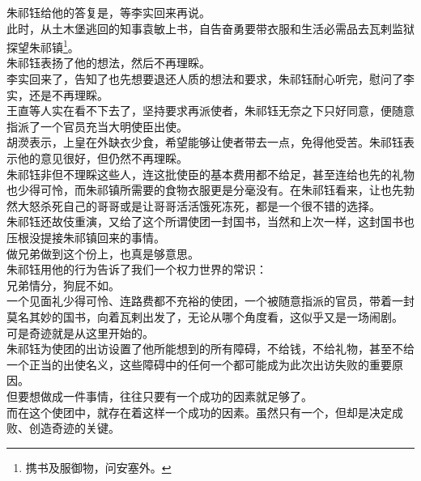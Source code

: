 \begin{multicols}{\theparacolNo}
朱祁钰给他的答复是，等李实回来再说。\\

此时，从土木堡逃回的知事袁敏上书，自告奋勇要带衣服和生活必需品去瓦剌监狱探望朱祁镇\footnote{携书及服御物，问安塞外。}。\\

朱祁钰表扬了他的想法，然后不再理睬。\\

李实回来了，告知了也先想要退还人质的想法和要求，朱祁钰耐心听完，慰问了李实，还是不再理睬。\\

王直等人实在看不下去了，坚持要求再派使者，朱祁钰无奈之下只好同意，便随意指派了一个官员充当大明使臣出使。\\

胡濙表示，上皇在外缺衣少食，希望能够让使者带去一点，免得他受苦。朱祁钰表示他的意见很好，但仍然不再理睬。\\

朱祁钰非但不理睬这些人，连这批使臣的基本费用都不给足，甚至连给也先的礼物也少得可怜，而朱祁镇所需要的食物衣服更是分毫没有。在朱祁钰看来，让也先勃然大怒杀死自己的哥哥或是让哥哥活活饿死冻死，都是一个很不错的选择。\\

朱祁钰还故伎重演，又给了这个所谓使团一封国书，当然和上次一样，这封国书也压根没提接朱祁镇回来的事情。\\

做兄弟做到这个份上，也真是够意思。\\

朱祁钰用他的行为告诉了我们一个权力世界的常识：\\

兄弟情分，狗屁不如。\\

一个见面礼少得可怜、连路费都不充裕的使团，一个被随意指派的官员，带着一封莫名其妙的国书，向着瓦剌出发了，无论从哪个角度看，这似乎又是一场闹剧。\\

可是奇迹就是从这里开始的。\\

朱祁钰为使团的出访设置了他所能想到的所有障碍，不给钱，不给礼物，甚至不给一个正当的出使名义，这些障碍中的任何一个都可能成为此次出访失败的重要原因。\\

但要想做成一件事情，往往只要有一个成功的因素就足够了。\\

而在这个使团中，就存在着这样一个成功的因素。虽然只有一个，但却是决定成败、创造奇迹的关键。\\


\end{multicols}
